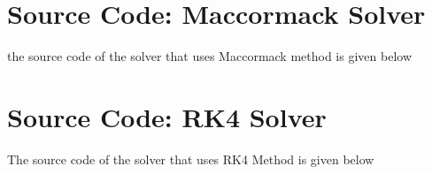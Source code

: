\documentclass[a4paper]{report}
\begin{document}
	\section{Source Code: Maccormack Solver}
	the source code of the solver that uses Maccormack method is given below
	\begin{framed}
		\lstset{breaklines=true}
		
	\end{framed}

	\section{Source Code: RK4 Solver}
	The source code of the solver that uses RK4 Method is given below
	\begin{framed}
		\lstset{breaklines=true}
		
	\end{framed}

	\renewcommand{\bibname}{References}
	
	\nocite{*}
	
\end{document}
